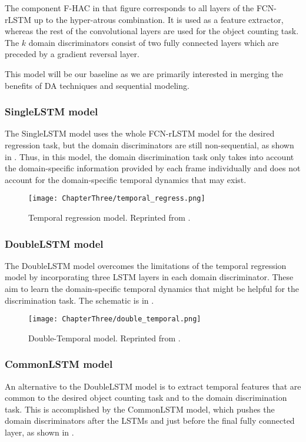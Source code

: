 The component F-HAC in that figure corresponds to all layers of the FCN-rLSTM up to the hyper-atrous combination. It is used as a feature extractor, whereas the rest of the convolutional layers are used for the object counting task. The $k$ domain discriminators consist of two fully connected layers which are preceded by a gradient reversal layer. 

This model will be our baseline as we are primarily interested in merging the benefits of DA techniques and sequential modeling.

\subsubsection{SingleLSTM model}
The SingleLSTM model uses the whole FCN-rLSTM model for the desired regression task, but the domain discriminators are still non-sequential, as shown in . Thus, in this model, the domain discrimination task only takes into account the domain-specific information provided by each frame individually and does not account for the domain-specific temporal dynamics that may exist.

\begin{figure}[h!]
	\centering
	\texttt{[image: ChapterThree/temporal\_regress.png]}
	\caption{Temporal regression model. Reprinted from \citet{ThesisFrancisco}.}
	\label{fig:temporal_regress_model}
\end{figure}

\subsubsection{DoubleLSTM model}
The DoubleLSTM model overcomes the limitations of the temporal regression model by incorporating three LSTM layers in each domain discriminator. These aim to learn the domain-specific temporal dynamics that might be helpful for the discrimination task. The schematic is in .

\begin{figure}[!ht]
	\centering
	\texttt{[image: ChapterThree/double\_temporal.png]}
	\caption{Double-Temporal model. Reprinted from \citet{ThesisFrancisco}.}
	\label{fig:double_temporal_model}
\end{figure}

\subsubsection{CommonLSTM model}
An alternative to the DoubleLSTM model is to extract temporal features that are common to the desired object counting task and to the domain discrimination task. This is accomplished by the CommonLSTM model, which pushes the domain discriminators after the LSTMs and just before the final fully connected layer, as shown in .

